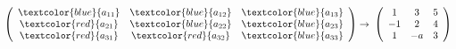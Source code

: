 \begin{proofw}\renewcommand{\qedsymbol}{$\diamond$}

\hspace{10mm}$\left( 
\begin{array}{ccc} \textcolor{blue}{a_{11}} & \textcolor{blue}{a_{12}} & \textcolor{blue}{a_{13}} \\
 \textcolor{red}{a_{21}} & \textcolor{blue}{a_{22}} & \textcolor{blue}{a_{23}} \\
\textcolor{red}{a_{31}} & \textcolor{red}{a_{32}} & \textcolor{blue}{a_{33}}
\end{array} \right) 
\to \; \left( \begin{array} {ccc}
1 &3 &5 \\-1 & 2 & 4 \\ 1 & -a & 3  	
\end{array} \right)$

	
\end{proofw}


